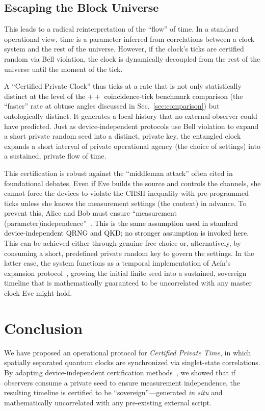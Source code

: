 \documentclass[reprint,aps,pra,longbibliography]{revtex4-2}
\newcommand{\rev}[1]{\textcolor{black}{#1}} %
\begin{document}
\subsection{Escaping the Block Universe}
This leads to a radical reinterpretation of the ``flow'' of time. In a standard operational view, time is a parameter inferred from correlations between a clock system and the rest of the universe. However, if the clock's ticks are certified random via Bell violation, the clock is dynamically decoupled from the rest of the universe until the moment of the tick.

A ``Certified Private Clock'' thus ticks at a rate that is not only statistically distinct \rev{at the level of the $++$ coincidence-tick benchmark comparison} (the ``faster'' rate at obtuse angles discussed in Sec.~\ref{sec:comparison}) but ontologically distinct. It generates a local history that no external observer could have predicted. Just as device-independent protocols use Bell violation to expand a short private random seed into a distinct, private key, the entangled clock expands a short interval of private operational agency (the choice of settings) into a sustained, private flow of time.

This certification is robust against the ``middleman attack'' often cited in foundational debates. Even if Eve builds the source and controls the channels, she cannot force the devices to violate the CHSH inequality with pre-programmed ticks unless she knows the measurement settings (the context) in advance. To prevent this, Alice and Bob must ensure ``measurement (parameter)independence''~\cite{shimony_1993}. \rev{This is the same assumption used in standard device-independent QRNG and QKD; no stronger assumption is invoked here.} This can be achieved either through genuine free choice or, alternatively, by consuming a short, predefined private random key to govern the settings. In the latter case, the system functions as a temporal implementation of Ac\'in's expansion protocol~\cite{Acin2016CertifiedRandomness}, growing the initial finite seed into a sustained, sovereign timeline that is mathematically guaranteed to be uncorrelated with any master clock Eve might hold.

\section{Conclusion}

We have proposed an operational protocol for \emph{Certified Private Time}, in which spatially separated quantum clocks are synchronized via singlet-state correlations. By adapting device-independent certification methods~\cite{Acin2016CertifiedRandomness}, we showed that if observers consume a private seed to ensure measurement independence, the resulting timeline is certified to be ``sovereign''---generated \emph{in situ} and mathematically uncorrelated with any pre-existing external script.
\end{document}
